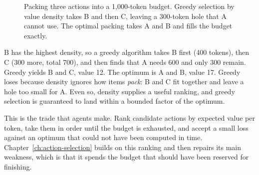 \documentclass[11pt]{book}
\begin{document}
\begin{figure}[htbp]
\centering
{}
\caption{Packing three actions into a 1{,}000-token budget. Greedy selection by value density takes B and then C, leaving a 300-token hole that A cannot use. The optimal packing takes A and B and fills the budget exactly.}
\label{fig:knapsack}
\end{figure}

B has the highest density, so a greedy algorithm takes B first (400 tokens), then C (300 more, total 700), and then finds that A needs 600 and only 300 remain. Greedy yields B and C, value 12. The optimum is A and B, value 17. Greedy loses because density ignores how items \emph{pack}: B and C fit together and leave a hole too small for A. Even so, density supplies a useful ranking, and greedy selection is guaranteed to land within a bounded factor of the optimum.

This is the trade that agents make. Rank candidate actions by expected value per token, take them in order until the budget is exhausted, and accept a small loss against an optimum that could not have been computed in time. Chapter~\ref{ch:action-selection} builds on this ranking and then repairs its main weakness, which is that it spends the budget that should have been reserved for finishing.
\end{document}
